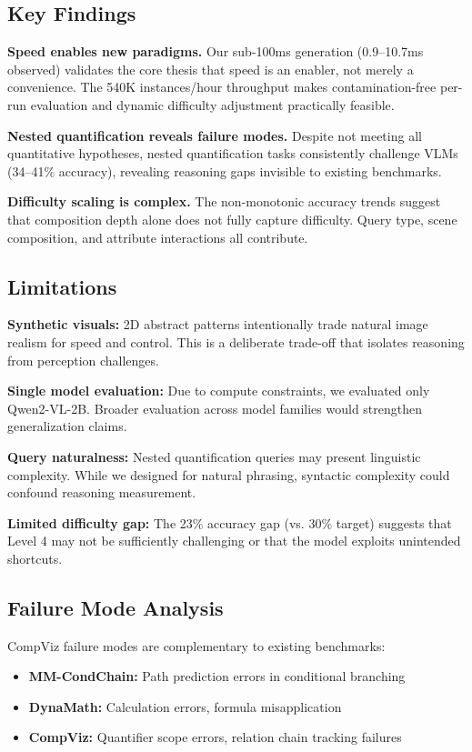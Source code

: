 \documentclass[11pt,a4paper]{article}
\begin{document}
\subsection{Key Findings}

\textbf{Speed enables new paradigms.} Our sub-100ms generation (0.9--10.7ms observed) validates the core thesis that speed is an enabler, not merely a convenience. The 540K instances/hour throughput makes contamination-free per-run evaluation and dynamic difficulty adjustment practically feasible.

\textbf{Nested quantification reveals failure modes.} Despite not meeting all quantitative hypotheses, nested quantification tasks consistently challenge VLMs (34--41\% accuracy), revealing reasoning gaps invisible to existing benchmarks.

\textbf{Difficulty scaling is complex.} The non-monotonic accuracy trends suggest that composition depth alone does not fully capture difficulty. Query type, scene composition, and attribute interactions all contribute.

\subsection{Limitations}

\textbf{Synthetic visuals:} 2D abstract patterns intentionally trade natural image realism for speed and control. This is a deliberate trade-off that isolates reasoning from perception challenges.

\textbf{Single model evaluation:} Due to compute constraints, we evaluated only Qwen2-VL-2B. Broader evaluation across model families would strengthen generalization claims.

\textbf{Query naturalness:} Nested quantification queries may present linguistic complexity. While we designed for natural phrasing, syntactic complexity could confound reasoning measurement.

\textbf{Limited difficulty gap:} The 23\% accuracy gap (vs. 30\% target) suggests that Level 4 may not be sufficiently challenging or that the model exploits unintended shortcuts.

\subsection{Failure Mode Analysis}

CompViz failure modes are complementary to existing benchmarks:
\begin{itemize}
    \item \textbf{MM-CondChain:} Path prediction errors in conditional branching
    \item \textbf{DynaMath:} Calculation errors, formula misapplication
    \item \textbf{CompViz:} Quantifier scope errors, relation chain tracking failures
\end{itemize}
\end{document}
